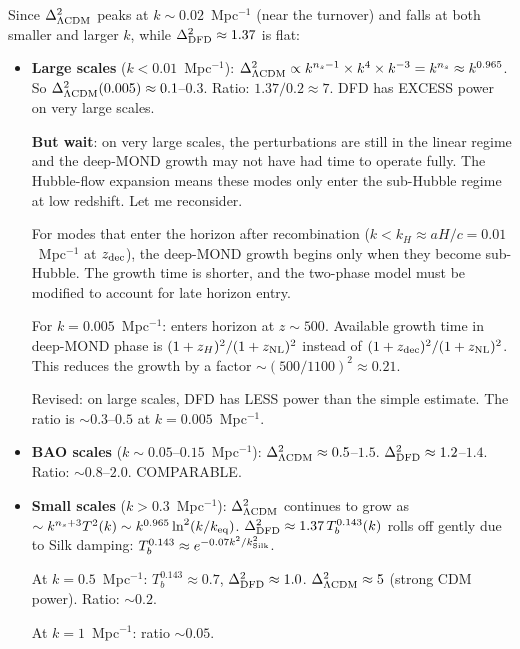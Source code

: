 \documentclass[11pt]{article}
\newcommand{\kSilk}{k_{\rm Silk}}
\begin{document}
Since $\Delta^2_{\Lambda\rm CDM}$ peaks at $k \sim 0.02$~Mpc$^{-1}$
(near the turnover) and falls at both smaller and larger $k$, while
$\Delta^2_{\rm DFD} \approx 1.37$ is flat:

\begin{itemize}
\item \textbf{Large scales} ($k < 0.01$~Mpc$^{-1}$):
  $\Delta^2_{\Lambda\rm CDM} \propto k^{n_s-1}\times k^4\times k^{-3}
  = k^{n_s} \approx k^{0.965}$.
  So $\Delta^2_{\Lambda\rm CDM}(0.005) \approx 0.1$--$0.3$.
  Ratio: $1.37/0.2 \approx 7$. DFD has EXCESS power on very large
  scales.

  \textbf{But wait}: on very large scales, the perturbations are
  still in the linear regime and the deep-MOND growth may not have
  had time to operate fully. The Hubble-flow expansion means these
  modes only enter the sub-Hubble regime at low redshift. Let me
  reconsider.

  For modes that enter the horizon after recombination ($k < k_H
  \approx aH/c = 0.01$~Mpc$^{-1}$ at $z_{\rm dec}$), the deep-MOND
  growth begins only when they become sub-Hubble. The growth time
  is shorter, and the two-phase model must be modified to account
  for late horizon entry.

  For $k = 0.005$~Mpc$^{-1}$: enters horizon at $z \sim 500$.
  Available growth time in deep-MOND phase is $(1+z_H)^2/(1+z_{\rm NL})^2$
  instead of $(1+z_{\rm dec})^2/(1+z_{\rm NL})^2$. This reduces the
  growth by a factor $\sim(500/1100)^2 \approx 0.21$.

  Revised: on large scales, DFD has LESS power than the simple
  estimate. The ratio is $\sim 0.3$--$0.5$ at $k = 0.005$~Mpc$^{-1}$.

\item \textbf{BAO scales} ($k \sim 0.05$--$0.15$~Mpc$^{-1}$):
  $\Delta^2_{\Lambda\rm CDM} \approx 0.5$--$1.5$.
  $\Delta^2_{\rm DFD} \approx 1.2$--$1.4$.
  Ratio: $\sim 0.8$--$2.0$. COMPARABLE.

\item \textbf{Small scales} ($k > 0.3$~Mpc$^{-1}$):
  $\Delta^2_{\Lambda\rm CDM}$ continues to grow as
  $\sim k^{n_s+3}T^2(k) \sim k^{0.965}\ln^2(k/k_{\rm eq})$.
  $\Delta^2_{\rm DFD} \approx 1.37\,T_b^{0.143}(k)$ rolls off
  gently due to Silk damping: $T_b^{0.143} \approx e^{-0.07k^2/\kSilk^2}$.

  At $k = 0.5$~Mpc$^{-1}$: $T_b^{0.143} \approx 0.7$,
  $\Delta^2_{\rm DFD} \approx 1.0$.
  $\Delta^2_{\Lambda\rm CDM} \approx 5$ (strong CDM power).
  Ratio: $\sim 0.2$.

  At $k = 1$~Mpc$^{-1}$: ratio $\sim 0.05$.
\end{itemize}
\end{document}
